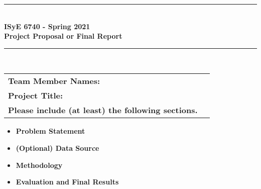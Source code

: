 \documentclass{article}
\begin{document}
\begin{titlepage}
	\clearpage\thispagestyle{empty}
	\centering
	\vspace{1cm}
		
	\rule{\linewidth}{1mm} \\[0.5cm]
	{ \Large \bfseries ISyE 6740 - Spring 2021\\[0.2cm]
		Project Proposal or Final Report}\\[0.5cm]
	\rule{\linewidth}{1mm} \\[1cm]
	
		\begin{tabular}{l p{5cm}}
		\textbf{Team Member Names:} &   \\[10pt]
		\textbf{Project Title:} &  \\[10pt]
		\textbf{Please include (at least) the following sections.} & \\
		\end{tabular} 

        \begin{itemize}
            \item[] \textbf{Problem Statement}
            \item[] \textbf{(Optional) Data Source}
            \item[] \textbf{Methodology}
            \item[] \textbf{Evaluation and Final Results}
        \end{itemize}
	
	\pagebreak

\end{titlepage}
\end{document}

